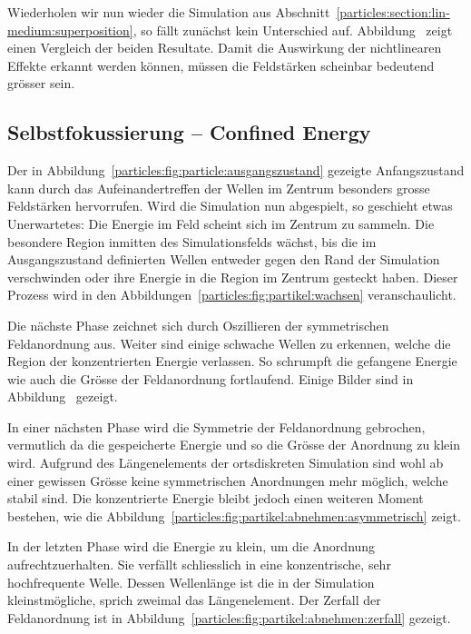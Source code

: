 Wiederholen wir nun wieder die Simulation aus Abschnitt~\ref{particles:section:lin-medium:superposition}, so fällt zunächst kein Unterschied auf.
Abbildung~ zeigt einen Vergleich der beiden Resultate.
Damit die Auswirkung der nichtlinearen Effekte erkannt werden können, müssen die Feldstärken scheinbar bedeutend grösser sein.

\subsection{Selbstfokussierung -- Confined Energy}

Der in Abbildung~\ref{particles:fig:particle:ausgangszustand} gezeigte Anfangszustand kann durch das Aufeinandertreffen der Wellen im Zentrum besonders grosse Feldstärken hervorrufen.
Wird die Simulation nun abgespielt, so geschieht etwas Unerwartetes: Die Energie im Feld scheint sich im Zentrum zu sammeln.
Die besondere Region inmitten des Simulationsfelds wächst, bis die im Ausgangszustand definierten Wellen entweder gegen den Rand der Simulation verschwinden oder ihre Energie in die Region im Zentrum gesteckt haben.
Dieser Prozess wird in den Abbildungen~\ref{particles:fig:partikel:wachsen} veranschaulicht.

Die nächste Phase zeichnet sich durch Oszillieren der symmetrischen Feldanordnung aus. 
Weiter sind einige schwache Wellen zu erkennen, welche die Region der konzentrierten Energie verlassen.
So schrumpft die gefangene Energie wie auch die Grösse der Feldanordnung fortlaufend.
Einige Bilder sind in Abbildung~ gezeigt.

In einer nächsten Phase wird die Symmetrie der Feldanordnung gebrochen, vermutlich da die gespeicherte Energie und so die Grösse der Anordnung zu klein wird.
Aufgrund des Längenelements der ortsdiskreten Simulation sind wohl ab einer gewissen Grösse keine symmetrischen Anordnungen mehr möglich, welche stabil sind.
Die konzentrierte Energie bleibt jedoch einen weiteren Moment bestehen, wie die Abbildung~\ref{particles:fig:partikel:abnehmen:asymmetrisch} zeigt.

In der letzten Phase wird die Energie zu klein, um die Anordnung aufrechtzuerhalten. 
Sie verfällt schliesslich in eine konzentrische, sehr hochfrequente Welle. 
Dessen Wellenlänge ist die in der Simulation kleinstmögliche, sprich zweimal das Längenelement.
Der Zerfall der Feldanordnung ist in Abbildung~\ref{particles:fig:partikel:abnehmen:zerfall} gezeigt.


